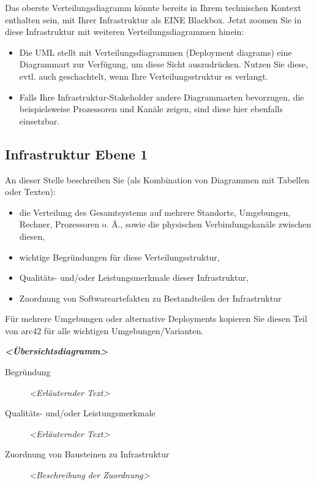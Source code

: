 \documentclass[]{article}
\begin{document}
Das oberste Verteilungsdiagramm könnte bereits in Ihrem technischen
Kontext enthalten sein, mit Ihrer Infrastruktur als EINE Blackbox. Jetzt
zoomen Sie in diese Infrastruktur mit weiteren Verteilungsdiagrammen
hinein:

\begin{itemize}
\item
  Die UML stellt mit Verteilungsdiagrammen (Deployment diagrams) eine
  Diagrammart zur Verfügung, um diese Sicht auszudrücken. Nutzen Sie
  diese, evtl. auch geschachtelt, wenn Ihre Verteilungsstruktur es
  verlangt.
\item
  Falls Ihre Infrastruktur-Stakeholder andere Diagrammarten bevorzugen,
  die beispielsweise Prozessoren und Kanäle zeigen, sind diese hier
  ebenfalls einsetzbar.
\end{itemize}

\hypertarget{_infrastruktur_ebene_1}{%
\subsection{Infrastruktur Ebene 1}\label{_infrastruktur_ebene_1}}

An dieser Stelle beschreiben Sie (als Kombination von Diagrammen mit
Tabellen oder Texten):

\begin{itemize}
\item
  die Verteilung des Gesamtsystems auf mehrere Standorte, Umgebungen,
  Rechner, Prozessoren o. Ä., sowie die physischen Verbindungskanäle
  zwischen diesen,
\item
  wichtige Begründungen für diese Verteilungsstruktur,
\item
  Qualitäts- und/oder Leistungsmerkmale dieser Infrastruktur,
\item
  Zuordnung von Softwareartefakten zu Bestandteilen der Infrastruktur
\end{itemize}

Für mehrere Umgebungen oder alternative Deployments kopieren Sie diesen
Teil von arc42 für alle wichtigen Umgebungen/Varianten.

\emph{\textbf{\textless{}Übersichtsdiagramm\textgreater{}}}

\begin{description}
\item[Begründung]
\emph{\textless{}Erläuternder Text\textgreater{}}
\item[Qualitäts- und/oder Leistungsmerkmale]
\emph{\textless{}Erläuternder Text\textgreater{}}
\item[Zuordnung von Bausteinen zu Infrastruktur]
\emph{\textless{}Beschreibung der Zuordnung\textgreater{}}
\end{description}
\end{document}
